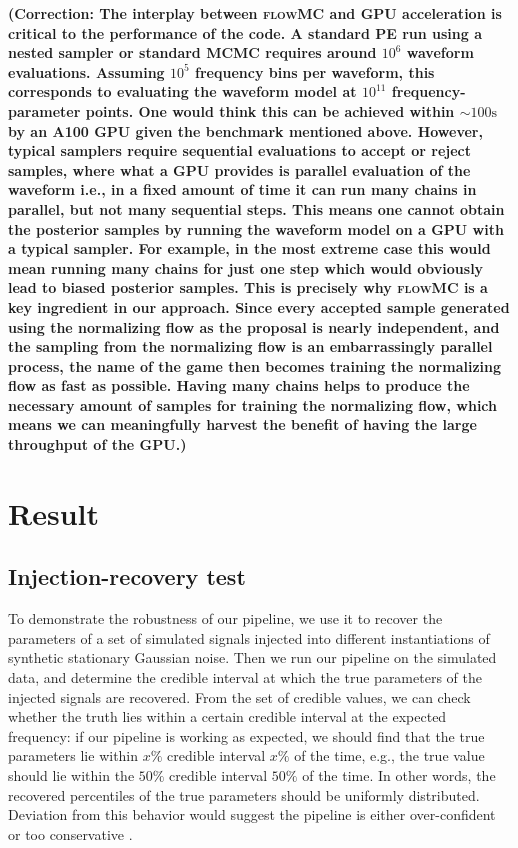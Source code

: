\documentclass[twocolumn]{aastex631}
\newcommand{\corr}[1]{\textbf{\color{pyRed}(Correction: #1)}}
\begin{document}
\corr{The interplay between \textsc{flowMC} and GPU acceleration is critical to
the performance of the code. A standard PE run using a nested sampler or
standard MCMC requires around $10^6$ waveform evaluations. Assuming $10^5$
frequency bins per waveform, this corresponds to evaluating the waveform model
at $10^{11}$ frequency-parameter points. One would think this can be achieved
within $\sim 100\textrm{s}$ by an A100 GPU given the benchmark mentioned above.
However, typical samplers require sequential evaluations to accept or reject samples,
where what a GPU provides is parallel evaluation of the waveform i.e., in a fixed amount of time it can run
many chains in parallel, but not many sequential steps.
This means one cannot obtain the posterior samples by running the waveform
model on a GPU with a typical sampler. For example, in the most extreme case this would mean running many
chains for just one step which would obviously lead to biased posterior samples.
This is precisely why \textsc{flowMC} is a key ingredient in our approach. Since every
accepted sample generated using the normalizing flow as the proposal is nearly independent,
and the sampling from the normalizing flow is an embarrassingly parallel
process, the name of the game then becomes training the normalizing flow as fast as
possible. Having many chains helps to produce the necessary amount of samples
for training the normalizing flow, which means we can meaningfully harvest
the benefit of having the large throughput of the GPU.}

\section{Result}
\label{sec: Result}
\subsection{Injection-recovery test}

To demonstrate the robustness of our pipeline, we use it to recover the
parameters of a set of simulated signals injected into different instantiations
of synthetic stationary Gaussian noise. Then we run our pipeline on the
simulated data, and determine the credible interval at which the true
parameters of the injected signals are recovered. From the set of credible
values, we can check whether the truth lies within a certain credible interval
at the expected frequency: if our pipeline is working as expected, we should
find that the true parameters lie within $x\%$ credible interval $x\%$ of the
time, e.g., the true value should lie within the $50\%$ credible interval
$50\%$ of the time. In other words, the recovered percentiles of the true
parameters should be uniformly distributed. Deviation from this behavior would
suggest the pipeline is either over-confident or too conservative
\citep{Cook2006,Talts2018}.
\end{document}

